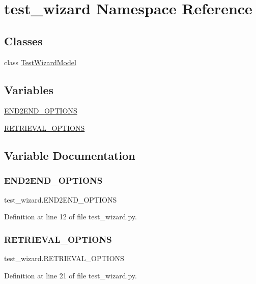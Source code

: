 \hypertarget{namespacetest__wizard}{}\section{test\+\_\+wizard Namespace Reference}
\label{namespacetest__wizard}
\subsection*{Classes}
\begin{DoxyCompactItemize}
\item 
class \hyperlink{classtest__wizard_1_1TestWizardModel}{Test\+Wizard\+Model}
\end{DoxyCompactItemize}
\subsection*{Variables}
\begin{DoxyCompactItemize}
\item 
\hyperlink{namespacetest__wizard_a0843d5d988bd8488a6650a21356fde21}{E\+N\+D2\+E\+N\+D\+\_\+\+O\+P\+T\+I\+O\+NS}
\item 
\hyperlink{namespacetest__wizard_afb087f070f016734182daff50be5d590}{R\+E\+T\+R\+I\+E\+V\+A\+L\+\_\+\+O\+P\+T\+I\+O\+NS}
\end{DoxyCompactItemize}


\subsection{Variable Documentation}
\mbox{\label{namespacetest__wizard_a0843d5d988bd8488a6650a21356fde21}} 
\subsubsection{\texorpdfstring{E\+N\+D2\+E\+N\+D\+\_\+\+O\+P\+T\+I\+O\+NS}{END2END\_OPTIONS}}
{\footnotesize\ttfamily test\+\_\+wizard.\+E\+N\+D2\+E\+N\+D\+\_\+\+O\+P\+T\+I\+O\+NS}



Definition at line 12 of file test\+\_\+wizard.\+py.

\mbox{\label{namespacetest__wizard_afb087f070f016734182daff50be5d590}} 
\subsubsection{\texorpdfstring{R\+E\+T\+R\+I\+E\+V\+A\+L\+\_\+\+O\+P\+T\+I\+O\+NS}{RETRIEVAL\_OPTIONS}}
{\footnotesize\ttfamily test\+\_\+wizard.\+R\+E\+T\+R\+I\+E\+V\+A\+L\+\_\+\+O\+P\+T\+I\+O\+NS}



Definition at line 21 of file test\+\_\+wizard.\+py.

